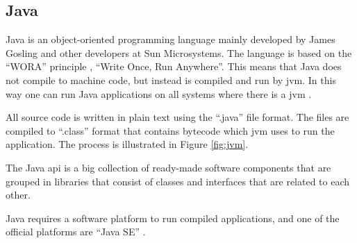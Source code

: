 \subsection{Java}

Java is an object-oriented programming language mainly developed by James Gosling and other developers at Sun Microsystems. The language is based on the ``WORA'' principle \cite{wora}, ``Write Once, Run Anywhere''. This means that Java does not compile to machine code, but instead is compiled and run by \acrfull{jvm}. In this way one can run Java applications on all systems where there is a \acrshort{jvm} \cite{java}.

All source code is written in plain text using the ``.java'' file format. The files are compiled to ``.class'' format that contains bytecode which \acrshort{jvm} uses to run the application. The process is illustrated in Figure \ref{fig:jvm}.


The Java \acrfull{api} is a big collection of ready-made software components that are grouped in libraries that consist of classes and interfaces that are related to each other.

Java requires a software platform to run compiled applications, and one of the official platforms are ``Java SE'' \cite{java}.